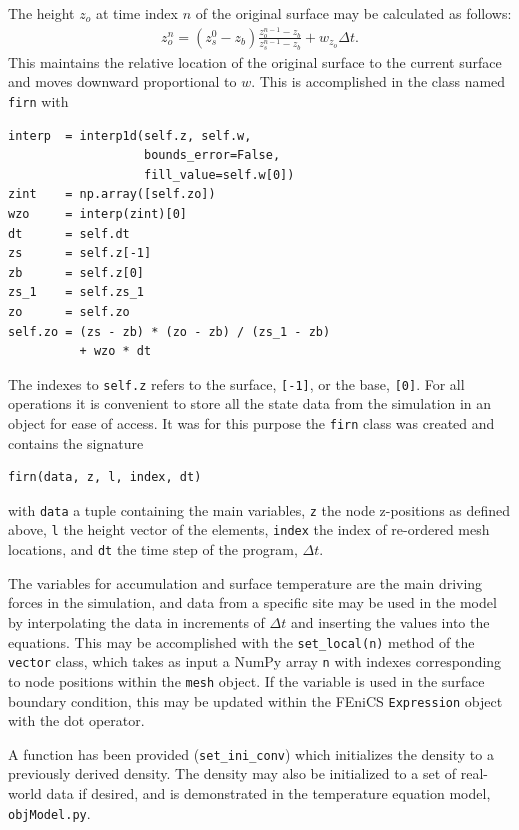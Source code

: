 \documentclass{article}%
\begin{document}
The height $z_o$ at time index $n$ of the original surface may be calculated as follows:
\begin{align*}
  z_o^{n} = (z_s^0 - z_b) \frac{z_o^{n-1} - z_b}{z_s^{n-1} - z_b}
           + w_{z_o} \Delta t.
\end{align*}
This maintains the relative location of the original surface to the current surface and moves downward proportional to $w$.  This is accomplished in the class named \texttt{firn} with\par
\footnotesize
\begin{verbatim}
interp  = interp1d(self.z, self.w,
                   bounds_error=False,
                   fill_value=self.w[0])
zint    = np.array([self.zo])
wzo     = interp(zint)[0]
dt      = self.dt
zs      = self.z[-1]
zb      = self.z[0]
zs_1    = self.zs_1
zo      = self.zo
self.zo = (zs - zb) * (zo - zb) / (zs_1 - zb) 
          + wzo * dt
\end{verbatim}
\normalsize
The indexes to \texttt{self.z} refers to the surface, \texttt{[-1]}, or the base, \texttt{[0]}.  For all operations it is convenient to store all the state data from the simulation in an object for ease of access.  It was for this purpose the \texttt{firn} class was created and contains the signature\par 
\footnotesize
\begin{verbatim}
firn(data, z, l, index, dt)
\end{verbatim}
\normalsize
with \texttt{data} a tuple containing the main variables, \texttt{z} the node z-positions as defined above, \texttt{l} the height vector of the elements, \texttt{index} the index of re-ordered mesh locations, and \texttt{dt} the time step of the program, $\Delta t$.

The variables for accumulation and surface temperature are the main driving forces in the simulation, and data from a specific site may be used in the model by interpolating the data in increments of $\Delta t$ and inserting the values into the equations.  This may be accomplished with the \texttt{set\_local(n)} method of the \texttt{vector} class, which takes as input a NumPy array \texttt{n} with indexes corresponding to node positions within the \texttt{mesh} object.  If the variable is used in the surface boundary condition, this may be updated within the FEniCS \texttt{Expression} object with the dot operator.

A function has been provided (\texttt{set\_ini\_conv}) which initializes the density to a previously derived density.  The density may also be initialized to a set of real-world data if desired, and is demonstrated in the temperature equation model, \texttt{objModel.py}.
\end{document}
